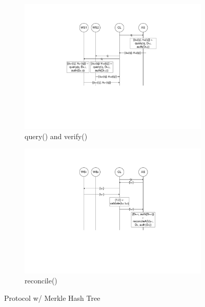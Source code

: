 \begin{figure}
        \begin{subfigure}[t]{0.495\textwidth}
                \centering
                \includegraphics[width=\textwidth]{figure/merkle_3.pdf}
                \caption{query() and verify()}
                \label{fig:merkle_3}
        \end{subfigure}
        \begin{subfigure}[t]{0.495\textwidth}
                \centering
                \includegraphics[width=\textwidth]{figure/merkle_4.pdf}
                \caption{reconcile()}
                \label{fig:merkle_4}
        \end{subfigure}
        \caption{Protocol w/ Merkle Hash Tree}
	\label{fig:merkle}
\end{figure}


